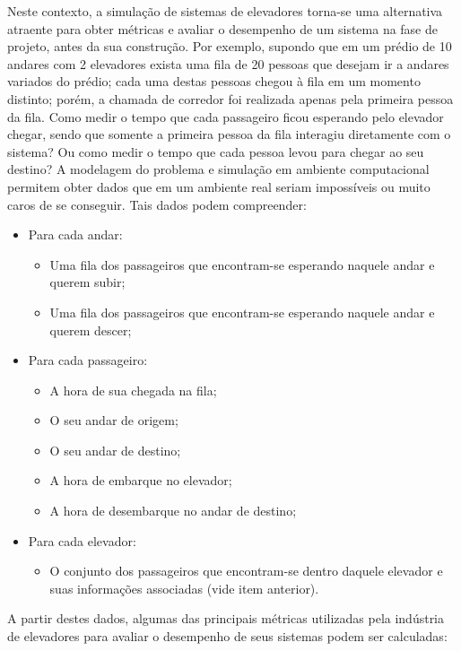 Neste contexto, a simulação de sistemas de elevadores torna-se uma alternativa
atraente para obter métricas e avaliar o desempenho de um sistema na fase de
projeto, antes da sua construção. Por exemplo, supondo que em um prédio de 10
andares com 2 elevadores exista uma fila de 20 pessoas que desejam ir a andares
variados do prédio; cada uma destas pessoas chegou à fila em um momento
distinto; porém, a chamada de corredor foi realizada apenas pela primeira pessoa
da fila. Como medir o tempo que cada passageiro ficou esperando pelo elevador
chegar, sendo que somente a primeira pessoa da fila interagiu diretamente com o
sistema? Ou como medir o tempo que cada pessoa levou para chegar ao seu destino?
A modelagem do problema e simulação em ambiente computacional permitem obter
dados que em um ambiente real seriam impossíveis ou muito caros de se conseguir.
Tais dados podem compreender:

\begin{itemize}
  \item Para cada andar:
  \begin{itemize}
    \item Uma fila dos passageiros que encontram-se esperando naquele andar e querem subir;
    \item Uma fila dos passageiros que encontram-se esperando naquele andar e querem descer;
  \end{itemize}
  \item Para cada passageiro:
  \begin{itemize}
    \item A hora de sua chegada na fila;
    \item O seu andar de origem;
    \item O seu andar de destino;
    \item A hora de embarque no elevador;
    \item A hora de desembarque no andar de destino;
  \end{itemize}
  \item Para cada elevador:
  \begin{itemize}
    \item O conjunto dos passageiros que encontram-se dentro daquele elevador e suas informações associadas (vide item anterior).
  \end{itemize}
\end{itemize}

A partir destes dados, algumas das principais métricas utilizadas pela indústria
de elevadores para avaliar o desempenho de seus sistemas podem ser calculadas:

